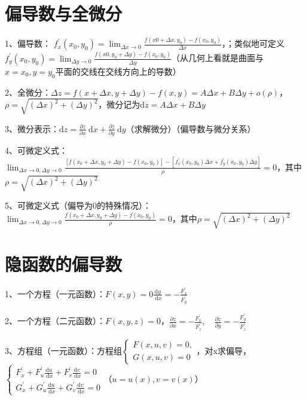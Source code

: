 \section{偏导数与全微分}

1、偏导数： $f_{x}^{\prime}\left(x_{0}, y_{0}\right)=\lim_{\Delta x \rightarrow 0} \frac{f\left(x{0}+\Delta x, y_{0}\right)-f\left(x_{0}, y_{0}\right)}{\Delta x}$，；类似地可定义$f_{y}^{\prime}\left(x_{0}, y_{0}\right)=\lim_{\Delta y \rightarrow 0} \frac{f\left(x{0}, y_{0}+\Delta y\right)-f\left(x_{0}, y_{0}\right)}{\Delta y}$（从几何上看就是曲面与$x=x_0,y=y_0$平面的交线在交线方向上的导数）

2、全微分：$\Delta z=f(x+\Delta x, y+\Delta y)-f(x, y)=A \Delta x+B \Delta y+o(\rho)$，$\rho=\sqrt{(\Delta x)^{2}+(\Delta y)^{2}}$，微分记为$\mathrm{d} z=A \Delta x+B \Delta y$

3、微分表示：$\mathrm{d} z=\frac{\partial z}{\partial x} \mathrm{~d} x+\frac{\partial z}{\partial y} \mathrm{~d} y$（求解微分）（偏导数与微分关系）

4、可微定义式：$\lim_{\Delta x \rightarrow 0,\Delta y \rightarrow 0}\frac{\left[f\left(x_{0}+\Delta x, y_{0}+\Delta y\right)-f\left(x_{0}, y_{0}\right)\right]-\left[f_{x}^{\prime}\left(x_{0}, y_{0}\right) \Delta x+f_{y}^{\prime}\left(x_{0}, y_{0}\right) \Delta y\right]}{\rho}=0$，其中$\rho=\sqrt{(\Delta x)^{2}+(\Delta y)^{2}}$

5、可微定义式（偏导为0的特殊情况）：$\lim_{\Delta x \rightarrow 0,\Delta y \rightarrow 0}\frac{f\left(x_{0}+\Delta x, y_{0}+\Delta y\right)-f\left(x_{0}, y_{0}\right)}{\rho}=0$，其中$\rho=\sqrt{(\Delta x)^{2}+(\Delta y)^{2}}$

\section{隐函数的偏导数}

1、一个方程（一元函数）：$F(x, y)=0$$\frac{\mathrm{d} y}{\mathrm{~d} x}=-\frac{F_{x}^{\prime}}{F_{y}^{\prime}}$

2、一个方程（二元函数）：$F(x, y, z)=0$，$\frac{\partial z}{\partial x}=-\frac{F_{x}^{\prime}}{F_{z}^{\prime}}, \quad \frac{\partial z}{\partial y}=-\frac{F_{y}^{\prime}}{F_{z}^{\prime}}$

3、方程组（一元函数）：方程组$\left\{\begin{array}{l}F(x, u, v)=0,  \\ G(x, u, v)=0\end{array}\right. $，对x求偏导，$\left\{\begin{array}{l} F_{x}^{\prime}+F_{u}^{\prime} \frac{\mathrm{d} u}{\mathrm{~d} x}+F_{v}^{\prime} \frac{\mathrm{d} v}{\mathrm{~d} x}=0 \\ G_{x}^{\prime}+G_{u}^{\prime} \frac{\mathrm{d} u}{\mathrm{~d} x}+G_{v}^{\prime} \frac{\mathrm{d} v}{\mathrm{~d} x}=0 \end{array}\right.$（$u=u(x), v=v(x)$）

